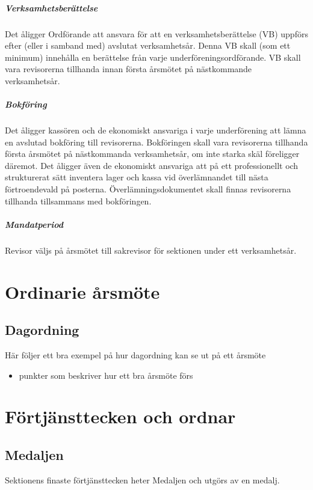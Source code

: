 \documentclass{../resources/dgovdoc}
\begin{document}
\subparagraph{Verksamhetsberättelse}

Det åligger Ordförande att ansvara för att en verksamhetsberättelse (VB) uppförs efter (eller i samband med) avslutat verksamhetsår. Denna VB skall (som ett minimum) innehålla en berättelse från varje underföreningsordförande. VB skall vara revisorerna tillhanda innan första årsmötet på nästkommande verksamhetsår.

\subparagraph{Bokföring}

Det åligger kassören och de ekonomiskt ansvariga i varje underförening att lämna en avslutad bokföring till revisorerna. Bokföringen skall vara revisorerna tillhanda första årsmötet på nästkommanda verksamhetsår, om inte starka skäl föreligger däremot.
Det åligger även de ekonomiskt ansvariga att på ett professionellt och strukturerat sätt inventera lager och kassa vid överlämnandet till nästa förtroendevald på posterna. Överlämningsdokumentet skall finnas revisorerna tillhanda tillsammans med bokföringen. 

\subparagraph{Mandatperiod}

Revisor väljs på årsmötet till sakrevisor för sektionen under ett verksamhetsår.

\section{Ordinarie årsmöte}

\subsection{Dagordning}

Här följer ett bra exempel på hur dagordning kan se ut på ett årsmöte

\begin{itemize}
\item punkter som beskriver hur ett bra årsmöte förs
\end{itemize}

\section{Förtjänsttecken och ordnar}

\subsection{Medaljen}

Sektionens finaste förtjänsttecken heter Medaljen och utgörs av en medalj. 
\end{document}
